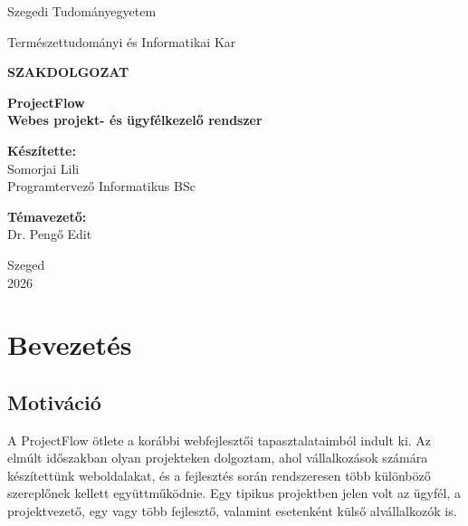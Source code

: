\documentclass[11pt,a4paper]{report}
\newcommand{\projectname}{ProjectFlow}
\begin{document}
    \begin{titlepage}
        \centering
        {\Large Szegedi Tudományegyetem\par}
        \vspace{0.4cm}
        {\large Természettudományi és Informatikai Kar\par}
        \vfill
        {\Huge\bfseries SZAKDOLGOZAT\par}
        \vspace{1.2cm}
        {\LARGE\bfseries \projectname\\ Webes projekt- és ügyfélkezelő rendszer\par}
        \vfill
        \begin{minipage}{0.45\textwidth}
            \raggedright
            \textbf{Készítette:}\\
            Somorjai Lili\\
            Programtervező Informatikus BSc
        \end{minipage}
        \hfill
        \begin{minipage}{0.45\textwidth}
            \raggedleft
            \textbf{Témavezető:}\\
            Dr. Pengő Edit\\

        \end{minipage}
        \vfill
        {\large Szeged\\2026\par}
    \end{titlepage}

    \tableofcontents
    \clearpage

    \chapter{Bevezetés}

    \section{Motiváció}

    A \projectname{} ötlete a korábbi webfejlesztői tapasztalataimból indult ki.
    Az elmúlt időszakban olyan projekteken dolgoztam, ahol vállalkozások számára
    készítettünk weboldalakat, és a fejlesztés során rendszeresen több különböző
    szereplőnek kellett együttműködnie. Egy tipikus projektben jelen volt az ügyfél,
    a projektvezető, egy vagy több fejlesztő, valamint esetenként külső
    alvállalkozók is.
\end{document}
